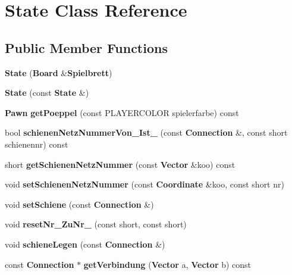 \section{State Class Reference}
\label{class_state}
\subsection*{Public Member Functions}
\begin{DoxyCompactItemize}
\item 
{\bfseries State} ({\bf Board} \&{\bf Spielbrett})\label{class_state_ab8e8b562af12bba2ae71a14fcfd87673}

\item 
{\bfseries State} (const {\bf State} \&)\label{class_state_a5ca97340266d486dfa42225f19c40de3}

\item 
{\bf Pawn} {\bfseries get\-Poeppel} (const P\-L\-A\-Y\-E\-R\-C\-O\-L\-O\-R spielerfarbe) const \label{class_state_aaef8af24ef660eecef8aa559ea6c6625}

\item 
bool {\bfseries schienen\-Netz\-Nummer\-Von\-\_\-\-Ist\-\_\-} (const {\bf Connection} \&, const short schienennr) const \label{class_state_a974ccf0cdff0adc321603f11c8df7970}

\item 
short {\bfseries get\-Schienen\-Netz\-Nummer} (const {\bf Vector} \&koo) const \label{class_state_a5d32c5f1439d14757830b7bbd6fde7cb}

\item 
void {\bfseries set\-Schienen\-Netz\-Nummer} (const {\bf Coordinate} \&koo, const short nr)\label{class_state_a61e844e517116c5ec1eaeb6886906df8}

\item 
void {\bfseries set\-Schiene} (const {\bf Connection} \&)\label{class_state_afa0cf80f1e1cc065fd63372c8ffc19be}

\item 
void {\bfseries reset\-Nr\-\_\-\-Zu\-Nr\-\_\-} (const short, const short)\label{class_state_ade757a61a90c393f8b7a3495221f1779}

\item 
void {\bfseries schiene\-Legen} (const {\bf Connection} \&)\label{class_state_a76034aee14f5704a970a7b4a831935e7}

\item 
const {\bf Connection} $\ast$ {\bfseries get\-Verbindung} ({\bf Vector} a, {\bf Vector} b) const \label{class_state_a668add718e776deb4fd34c5dbaeabfb5}


\end{DoxyCompactItemize}
